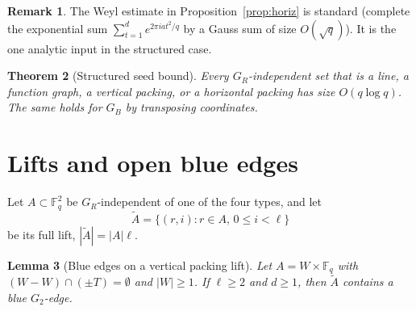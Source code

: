 \documentclass[11pt]{article}
\newtheorem{theorem}{Theorem}
\newtheorem{lemma}[theorem]{Lemma}
\theoremstyle{definition}
\newtheorem{remark}[theorem]{Remark}
\newcommand{\F}{\mathbb{F}}
\begin{document}
\begin{remark}
The Weyl estimate in Proposition~\ref{prop:horiz} is standard (complete the exponential sum $\sum_{t=1}^{d}e^{2\pi i at^{2}/q}$ by a Gauss sum of size $O(\sqrt{q})$).
It is the one analytic input in the structured case.
\end{remark}

\begin{theorem}[Structured seed bound]\label{thm:struct}
Every $G_R$-independent set that is a line, a function graph, a vertical packing, or a horizontal packing has size $O(q\log q)$.
The same holds for $G_B$ by transposing coordinates.
\end{theorem}

\section{Lifts and open blue edges}

Let $A\subset\F_q^{2}$ be $G_R$-independent of one of the four types, and let
\[
  \widetilde A=\bigl\{(r,i):r\in A,\,0\le i<\ell\bigr\}
\]
be its full lift, $|\widetilde A|=|A|\ell$.

\begin{lemma}[Blue edges on a vertical packing lift]\label{lem:blue-vert}
Let $A=W\times\F_q$ with $(W-W)\cap(\pm T)=\emptyset$ and $|W|\ge 1$.
If $\ell\ge 2$ and $d\ge 1$, then $\widetilde A$ contains a blue $G_2$-edge.
\end{lemma}
\end{document}
